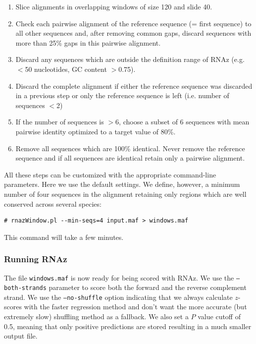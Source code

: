 \documentclass[11pt]{article}
\begin{document}
\begin{enumerate}

\item Slice alignments in overlapping windows of size 120 and slide 40.
\item Check each pairwise alignment of the reference sequence (= first
  sequence) to all other sequences and, after removing common gaps,
  discard sequences with more than 25\% gaps in this pairwise
  alignment.
\item Discard any sequences which are outside the definition range of
  RNAz (e.g. $<$50 nucleotides, GC content $>$0.75). 
\item Discard the complete alignment if either the reference sequence was
  discarded in a previous step or only the reference sequence is left (i.e.
  number of sequences $<$2)
\item If the number of sequences is $>$6, choose a subset of 6 sequences
  with mean pairwise identity optimized to a target value of 80\%.
\item Remove all sequences which are 100\% identical. Never remove the
  reference sequence and if all sequences are identical retain only a
  pairwise alignment.

\end{enumerate}

All these steps can be customized with the appropriate command-line
parameters. Here we use the default settings. We define, however, a minimum
number of four sequences in the alignment retaining only regions which are
well conserved across several species:

\begin{verbatim}
# rnazWindow.pl --min-seqs=4 input.maf > windows.maf
\end{verbatim}

This command will take a few minutes.

\subsubsection{Running RNAz}

The file \texttt{windows.maf} is now ready for being scored with
RNAz. We use the \texttt{--both-strands} parameter to score both the
forward and the reverse complement strand. We use the
\texttt{--no-shuffle} option indicating that we always calculate
$z$-scores with the faster regression method and don't want the more
accurate (but extremely slow) shuffling method as a fallback.  We also
set a $P$ value cutoff of 0.5, meaning that only positive predictions
are stored resulting in a much smaller output file.
\end{document}
